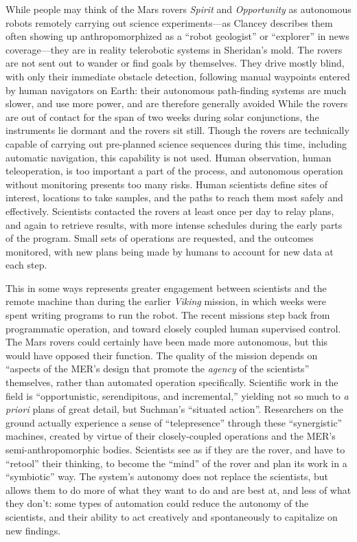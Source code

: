 While people may
think of the Mars rovers \emph{Spirit} and \emph{Opportunity} as
autonomous robots remotely carrying out science experiments---as
Clancey describes them often showing up anthropomorphized as a ``robot
geologist'' or 
``explorer'' in news coverage\cite[p. 7]{???-clancey}---they are
in reality telerobotic systems in Sheridan's mold. The rovers are not
sent out to wander or find goals by themselves. They drive mostly
blind, with only their immediate obstacle detection, following manual
waypoints entered by human navigators on Earth: their autonomous
path-finding systems are much slower, and use more power, and are
therefore generally avoided\cite[p. 118]{???-clancey} While the rovers
are out of contact for the span of two weeks during solar
conjunctions, the instruments lie dormant and the rovers sit
still\cite[p. 25]{???-clancey}. Though the rovers are technically capable of
carrying out pre-planned science sequences during this time, including
automatic navigation, this capability is not used. Human observation,
human teleoperation, is too important a part of the process, and
autonomous operation without monitoring presents too many risks. Human
scientists define sites of interest, locations to take samples, and
the paths to reach them most safely and effectively. Scientists
contacted the rovers at least once per day to relay plans, and again
to retrieve results, with more intense schedules during the early
parts of the program\cite[p. 58]{???-clancey}. Small sets of
operations are requested, and the outcomes monitored, with new plans
being made by humans to account for new data at each step.

This in some ways
represents greater engagement between scientists and the remote
machine than during the earlier \emph{Viking} mission, in which weeks
were spent writing programs to run the robot.\cite[p. 58]{???-clancey}
The recent missions step back
from programmatic operation, and toward closely coupled human
supervised control. The Mars rovers could
certainly have been made more autonomous, but this would have opposed
their function. The quality of the mission depends on ``aspects of the
MER's design that promote the \emph{agency} of the scientists''
themselves, rather than automated operation specifically\cite[p.
  xii]{???-clancey}. Scientific work in the field is ``opportunistic,
serendipitous, and incremental,''\cite[p. 32]{???-clancey} yielding
not so much to \emph{a priori}
plans of great detail, but Suchman's ``situated
action''\cite{???-suchman}. Researchers on the ground actually
experience a sense of ``telepresence'' through these ``synergistic'' machines, created
by virtue of their closely-coupled operations and the MER's
semi-anthropomorphic bodies\cite[p. 55]{???-clancey}. Scientists see
as if they are the rover, and have to ``retool'' their thinking, to
become the ``mind'' of the rover and plan its work in a ``symbiotic''
way\cite[p. 106, 110, 118]{???-clancey}. The system's autonomy does not replace the
scientists, but allows them to do more of what they want to do and are
best at, and less of what they don't: some types of automation could reduce the
autonomy of the scientists, and their ability to act creatively and
spontaneously to capitalize on new findings\cite[p.
  118-119]{???-clancey}. 

